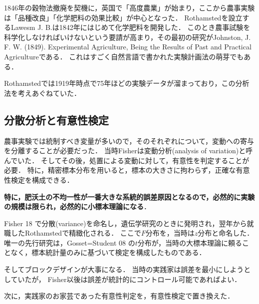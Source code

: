 \documentclass[uplatex,dvipdfmx]{jsreport}
\begin{document}
\begin{history}[高度農業]
    1846年の穀物法撤廃を契機に，英国で「高度農業」が始まり，ここから農事実験は「品種改良」「化学肥料の効果比較」が中心となった．
    Rothamstedを設立するLawesm J. B.は1842年にはじめて化学肥料を開発した．
    このとき農事試験を科学化しなければいけないという要請が高まり，その最初の研究がJohnston, J. F. W. (1849). Experimental Agriculture, Being the Results of Past and Practical Agricultureである．
    これはすごく自然言語で書かれた実験計画法の萌芽でもある．
\end{history}

\begin{history}
    Rothamstedでは1919年時点で75年ほどの実験データが溜まっており，この分析法を考えあぐねていた．
\end{history}

\subsection{分散分析と有意性検定}

\begin{tcolorbox}[colframe=ForestGreen, colback=ForestGreen!10!white,breakable,colbacktitle=ForestGreen!40!white,coltitle=black,fonttitle=\bfseries\sffamily,
title=]
    農事実験では統制すべき変量が多いので，そのそれぞれについて，変動への寄与を分離することが必要だった．
    当時Fisherは変動分析(analysis of variation)と呼んでいた．
    そしてその後，処置による変動に対して，有意性を判定することが必要．
    特に，精密標本分布を用いると，標本の大きさに拘わらず，正確な有意性検定を構成できる．

    \textbf{特に，肥沃土の不均一性が一番大きな系統的誤差原因となるので，必然的に実験の規模は限られ，必然的に小標本理論になる}．
\end{tcolorbox}

\begin{history}
    Fisher 18 \cite{Fisher18}で分散(variance)を命名し，遺伝学研究のときに発明され，翌年から就職したRothamstedで精緻化される．
    ここで$F$分布を，当時は$z$分布と命名した．
    唯一の先行研究は，Gosset=Student 08 \cite{Gosset08}の$t$分布が，当時の大標本理論に頼ることなく，標本統計量のみに基づいて検定を構成したものである．
\end{history}

そしてブロックデザインが大事になる．
当時の実践家は誤差を最小にしようとしていたが，
Fisher以後は誤差が統計的にコントロール可能であればよい．

次に，実践家のお家芸であった有意性判定を，有意性検定で置き換えた．
\end{document}
